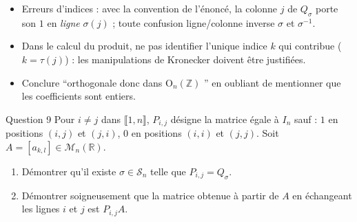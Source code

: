 \documentclass[11pt,a4paper]{article}
\newcommand{\og}{``}
\newcommand{\fg}{''}
\newcommand{\Z}{\mathbb{Z}}
\newcommand{\R}{\mathbb{R}}
\newcommand{\Mn}[1][n]{\mathcal{M}_{#1}}
\newcommand{\On}[1][n]{\mathrm{O}_{#1}}
\newcommand{\Perm}[1][n]{\mathcal{S}_{#1}} %
\newcommand{\ii}[2]{\llbracket #1,#2\rrbracket}
\begin{document}
\begin{pieges}
\begin{itemize}[leftmargin=1.4em, itemsep=2pt]
\item Erreurs d'indices : avec la convention de l'énoncé, la colonne
$j$ de $Q_\sigma$ porte son $1$ en \emph{ligne} $\sigma(j)$ ; toute
confusion ligne/colonne inverse $\sigma$ et $\sigma^{-1}$.
\item Dans le calcul du produit, ne pas identifier l'unique indice $k$
qui contribue ($k=\tau(j)$) : les manipulations de Kronecker doivent
être justifiées.
\item Conclure \og orthogonale donc dans $\On(\Z)$ \fg{} en oubliant de
mentionner que les coefficients sont entiers.
\end{itemize}
\end{pieges}

\begin{enonce}{Question 9}
Pour $i\neq j$ dans $\ii{1}{n}$, $P_{i,j}$ désigne la matrice égale à
$I_n$ sauf : $1$ en positions $(i,j)$ et $(j,i)$, $0$ en positions
$(i,i)$ et $(j,j)$. Soit $A=[a_{k,l}]\in\Mn(\R)$.
\begin{enumerate}
\item Démontrer qu'il existe $\sigma\in\Perm$ telle que
$P_{i,j}=Q_\sigma$.
\item Démontrer soigneusement que la matrice obtenue à partir de $A$
en échangeant les lignes $i$ et $j$ est $P_{i,j}A$.
\end{enumerate}
\end{enonce}
\end{document}
